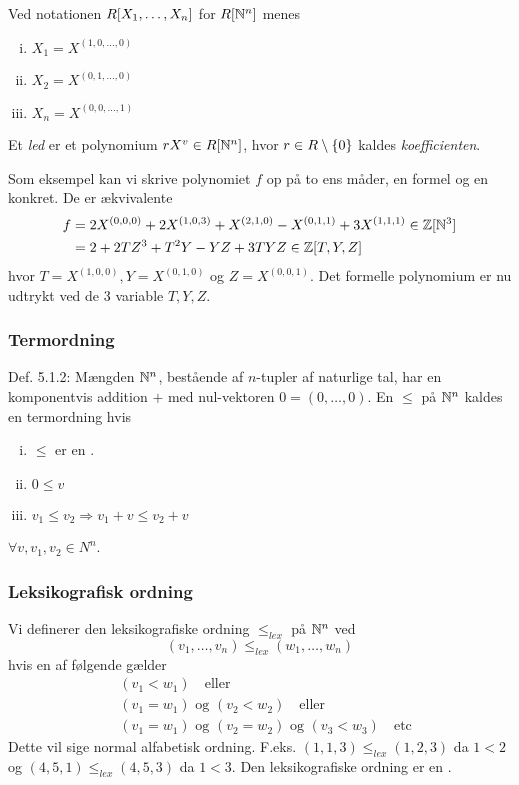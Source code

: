 Ved notationen $R[X_1,\ldots,X_n]$ for $R[\mathbb{N}^n]$ menes
\begin{enumerate}[(i)]
  \item $X_1 = X^{(1,0,\ldots,0)}$
  \item $X_2 = X^{(0,1,\ldots,0)}$
  \item $X_n = X^{(0,0,\ldots,1)}$
\end{enumerate}

Et \textit{led} er et polynomium $rX^v \in R[\mathbb{N}^n]$, hvor $r \in
R\setminus \{ 0 \}$ kaldes \textit{koefficienten}.

Som eksempel kan vi skrive polynomiet $f$ op på to ens måder, en formel og en
konkret. De er ækvivalente
\begin{align*}
  f &= 2X^{(0,0,0)} + 2X^{(1,0,3)} + X^{(2,1,0)} - X^{(0,1,1)} + 3X^{(1,1,1)}
  \in \mathbb{Z}[\mathbb{N}^3]\\
    &= 2 + 2TZ^3 + T^2 Y - YZ + 3TYZ \in \mathbb{Z}[T,Y,Z] 
\end{align*}
hvor $T = X^{(1,0,0)}, Y = X^{(0,1,0)}$ og $Z = X^{(0,0,1)}$. Det formelle
polynomium er nu udtrykt ved de 3 variable $T,Y,Z$.



\subsubsection{Termordning}
\label{Termordning}
Def. 5.1.2: Mængden $\mathbb{N}^n$, bestående af $n$-tupler af naturlige tal, har en
komponentvis addition $+$ med nul-vektoren $0 = (0,\ldots,0)$. En
 $\leq$ på $\mathbb{N}^n$ kaldes en termordning hvis
\begin{enumerate}[(i)]
  \item $\leq$ er en .
  \item $0 \leq v$
  \item $v_1 \leq v_2 \Rightarrow v_1 + v \leq v_2 + v$
\end{enumerate}
$\forall v, v_1, v_2 \in N^n$.

\subsubsection{Leksikografisk ordning}
\label{Leksikografisk ordning}
Vi definerer den leksikografiske ordning $\leq_{lex}$ på $\mathbb{N}^n$ ved
\begin{equation*}
  (v_1,\ldots,v_n) \leq_{lex} (w_1,\ldots,w_n)
\end{equation*}
hvis en af følgende gælder
\begin{align*}
  &(v_1 < w_1) \quad \text{eller}\\
  &(v_1 = w_1) \text{ og } (v_2 < w_2) \quad \text{eller}\\
  &(v_1 = w_1) \text{ og } (v_2 = w_2) \text{ og } (v_3 < w_3) \quad \text{etc}
\end{align*}
Dette vil sige normal alfabetisk ordning. F.eks. $(1,1,3) \leq_{lex} (1,2,3)$
da $1 < 2$ og $(4,5,1) \leq_{lex} (4,5,3)$ da $1 < 3$. Den leksikografiske
ordning er en .

